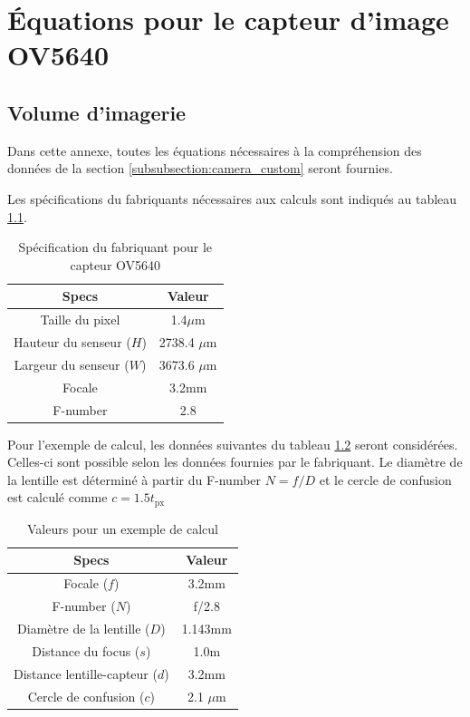 
%
%

\chapter{Équations pour le capteur d'image OV5640}
\label{annexe:equation_camera_custom}

\section{Volume d'imagerie}
\label{annexe:volume_imagerie}

Dans cette annexe, toutes les équations nécessaires à la compréhension des données de la section \ref{subsubsection:camera_custom} seront fournies.

Les spécifications du fabriquants nécessaires aux calculs sont indiqués au tableau \ref{t:specs_camera_custom}.

\begin{table}[!htb]
\footnotesize
\centering
    \begin{tabular}{|c|c|}
    \hline
    Specs & Valeur\\
    \hline\hline
    Taille du pixel & 1.4$\mu$m\\
    Hauteur du senseur ($H$) & 2738.4 $\mu$m\\
    Largeur du senseur ($W$) & 3673.6 $\mu$m\\
    Focale & 3.2mm\\
    F-number & 2.8\\
    \hline
    \end{tabular}
\caption{Spécification du fabriquant pour le capteur OV5640 \cite{OV5640}}
\label{t:specs_camera_custom}
\end{table}

Pour l'exemple de calcul, les données suivantes du tableau \ref{t:ex_calcul_camera_custom} seront considérées. Celles-ci sont possible selon les données fournies par le fabriquant. Le diamètre de la lentille est déterminé à partir du F-number $N=f/D$ et le cercle de confusion est calculé comme $c=1.5 t_\text{px}$
\begin{table}[!htb]
\footnotesize
\centering
    \begin{tabular}{|c|c|}
    \hline
    Specs & Valeur\\
    \hline\hline
    Focale ($f$) & 3.2mm\\
    F-number ($N$) & f/2.8\\
    Diamètre de la lentille ($D$) & 1.143mm\\
    Distance du focus ($s$) & 1.0m\\
    Distance lentille-capteur ($d$) & 3.2mm\\
    Cercle de confusion ($c$) &  2.1 $\mu$m\\
    \hline
    \end{tabular}
\caption{Valeurs pour un exemple de calcul}
\label{t:ex_calcul_camera_custom}
\end{table}

